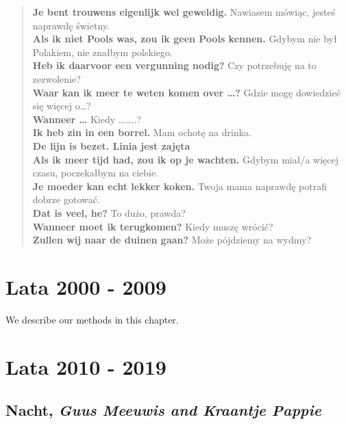 \documentclass[
]{book}
\begin{document}
\begin{quote}
\textbf{Je bent trouwens eigenlijk wel geweldig.} Nawiasem mówiąc, jesteś naprawdę świetny.\\
\textbf{Als ik niet Pools was, zou ik geen Pools kennen.} Gdybym nie był Polakiem, nie znałbym polskiego.\\
\textbf{Heb ik daarvoor een vergunning nodig?} Czy potrzebuję na to zezwolenie?\\
\textbf{Waar kan ik meer te weten komen over \ldots?} Gdzie mogę dowiedzieć się więcej o\ldots?\\
\textbf{Wanneer \ldots{}} Kiedy \ldots\ldots..?\\
\textbf{Ik heb zin in een borrel.} Mam ochotę na drinka.\\
\textbf{De lijn is bezet. Linia jest zajęta}\\
\textbf{Als ik meer tijd had, zou ik op je wachten.} Gdybym miał/a więcej czasu, poczekałbym na ciebie.\\
\textbf{Je moeder kan echt lekker koken.} Twoja mama naprawdę potrafi dobrze gotować.\\
\textbf{Dat is veel, he?} To dużo, prawda?\\
\textbf{Wanneer moet ik terugkomen?} Kiedy muszę wrócić?\\
\textbf{Zullen wij naar de duinen gaan?} Może pójdziemy na wydmy?
\end{quote}

\hypertarget{lata-2000---2009}{%
\chapter{Lata 2000 - 2009}\label{lata-2000---2009}}

We describe our methods in this chapter.

\hypertarget{lata-2010---2019}{%
\chapter{Lata 2010 - 2019}\label{lata-2010---2019}}

\hypertarget{Nacht}{%
\section{\texorpdfstring{Nacht, \emph{Guus Meeuwis and Kraantje Pappie}}{Nacht, Guus Meeuwis and Kraantje Pappie}}\label{Nacht}}
\end{document}
